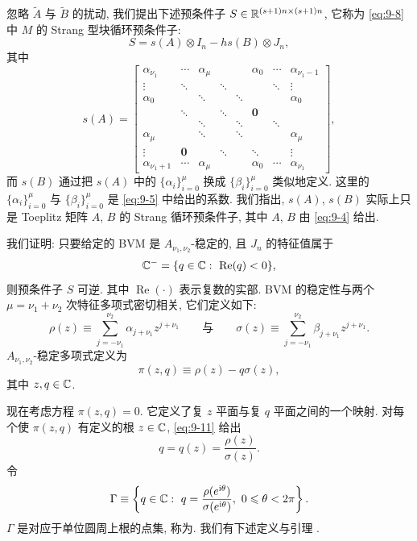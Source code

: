 忽略 $\widetilde{A}$ 与 $\widetilde{B}$ 的扰动, 我们提出下述预条件子 $S\in\mathbb{R}^{(s+1)n\times(s+1)n}$, 它称为 \eqref{eq:9-8} 中 $M$ 的 Strang 型块循环预条件子:
\begin{equation}
  S=s(A)\otimes I_n-hs(B)\otimes J_n,
  \label{eq:9-9}
\end{equation}
其中
\[
  s(A)=\begin{bmatrix}
    \alpha_{\nu_1} & \cdots & \alpha_{\mu} & & & \alpha_0 & \cdots & \alpha_{\nu_1-1}\\
    \vdots & \ddots & & \ddots & & & \ddots & \vdots\\
    \alpha_0 & & \ddots & & \ddots & & & \alpha_0\\
    & \ddots & & \ddots & & \mathbf{0} & & \\
    & & \ddots & & \ddots & & \ddots & \\
    \alpha_{\mu} & & \ddots & & \ddots & & & \alpha_{\mu}\\
    \vdots & \mathbf{0} & & \ddots & & \ddots & & \vdots\\
    \alpha_{\nu_1+1} & \cdots & \alpha_{\mu} & & & \alpha_0 & \cdots & \alpha_{\nu_1}
  \end{bmatrix},
\]
而 $s(B)$ 通过把 $s(A)$ 中的 $\{\alpha_i\}_{i=0}^{\mu}$ 换成 $\{\beta_i\}_{i=0}^{\mu}$ 类似地定义. 这里的 $\{\alpha_i\}_{i=0}^{\mu}$ 与 $\{\beta_i\}_{i=0}^{\mu}$ 是 \eqref{eq:9-5} 中给出的系数. 我们指出, $s(A)$, $s(B)$ 实际上只是 Toeplitz 矩阵 $A$, $B$ 的 Strang 循环预条件子, 其中 $A$, $B$ 由 \eqref{eq:9-4} 给出.

我们证明: 只要给定的 BVM 是 $A_{\nu_1,\nu_2}$-稳定的, 且 $J_n$ 的特征值属于
\[
  \C^-=\{q\in\C:\ \operatorname{Re}(q)<0\},
\]
则预条件子 $S$ 可逆. 其中 $\operatorname{Re}(\cdot)$ 表示复数的实部. BVM 的稳定性与两个 $\mu=\nu_1+\nu_2$ 次特征多项式密切相关, 它们定义如下:
\begin{equation}
  \rho(z)\equiv\sum_{j=-\nu_1}^{\nu_2}\alpha_{j+\nu_1}z^{j+\nu_1}
  \qquad\text{与}\qquad
  \sigma(z)\equiv\sum_{j=-\nu_1}^{\nu_2}\beta_{j+\nu_1}z^{j+\nu_1}.
  \label{eq:9-10}
\end{equation}
$A_{\nu_1,\nu_2}$-稳定多项式定义为
\begin{equation}
  \pi(z,q)\equiv\rho(z)-q\sigma(z),
  \label{eq:9-11}
\end{equation}
其中 $z,q\in\mathbb{C}$.

现在考虑方程 $\pi(z,q)=0$. 它定义了复 $z$ 平面与复 $q$ 平面之间的一个映射. 对每个使 $\pi(z,q)$ 有定义的根 $z\in\mathbb{C}$, \eqref{eq:9-11} 给出
\[
  q=q(z)=\frac{\rho(z)}{\sigma(z)}.
\]
令
\begin{equation}
  \Gamma\equiv\left\{q\in\C:\ q=\frac{\rho(e^{\ii\theta})}{\sigma(e^{\ii\theta})},\ 0\leqslant\theta<2\pi\right\}.
  \label{eq:9-12}
\end{equation}
$\Gamma$ 是对应于单位圆周上根的点集, 称为. 我们有下述定义与引理 \cite{src:10}.

